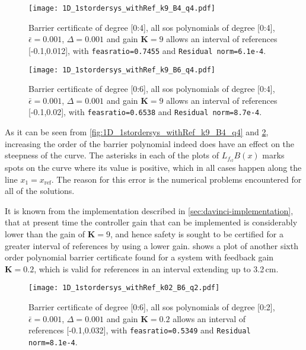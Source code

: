 \begin{figure}[H]
\centering
\texttt{[image: 1D\_1stordersys\_withRef\_k9\_B4\_q4.pdf]}
\caption{Barrier certificate of degree [0:4], all \gls{sos} polynomials of degree [0:4], $\bar{\epsilon}=0.001$, $\Delta=0.001$ and gain $\textbf{K}=9$ allows an interval of references [-0.1,0.012], with \texttt{feasratio=0.7455} and \texttt{Residual norm=6.1e-4}.}
\label{fig:1D_1stordersys_withRef_k9_B4_q4}
\end{figure}
\vspace{2mm}
\begin{figure}[H]
\centering
\texttt{[image: 1D\_1stordersys\_withRef\_k9\_B6\_q4.pdf]}
\caption{Barrier certificate of degree [0:6], all \gls{sos} polynomials of degree [0:4], $\bar{\epsilon}=0.001$, $\Delta=0.001$ and gain $\textbf{K}=9$ allows an interval of references [-0.1,0.02], with \texttt{feasratio=0.6538} and \texttt{Residual norm=8.7e-4}.}
\label{fig:1D_1stordersys_withRef_k9_B6_q4}
\end{figure}

As it can be seen from \autoref{fig:1D_1stordersys_withRef_k9_B4_q4} and \ref{fig:1D_1stordersys_withRef_k9_B6_q4}, increasing the order of the barrier polynomial indeed does have an effect on the steepness of the curve.
The asterisks in each of the plots of $L_{f_{cl}}B(x)$ marks spots on the curve where its value is positive, which in all cases happen along the line $x_1=x_\text{ref}$. The reason for this error is the numerical problems encountered for all of the solutions.

It is known from the implementation described in \autoref{sec:davinci-implementation}, that at present time the controller gain that can be implemented is considerably lower than the gain of $\mathbf{K}=9$, and hence safety is sought to be certified for a greater interval of references by using a lower gain.  shows a plot of another sixth order polynomial barrier certificate found for a system with feedback gain $\mathbf{K}=0.2$, which is valid for references in an interval extending up to 3.2\,cm.

\vspace{5mm}
\begin{figure}[htbp]
\centering
\texttt{[image: 1D\_1stordersys\_withRef\_k02\_B6\_q2.pdf]}
\caption{Barrier certificate of degree [0:6], all \gls{sos} polynomials of degree [0:2], $\bar{\epsilon}=0.001$, $\Delta=0.001$ and gain $\textbf{K}=0.2$ allows an interval of references [-0.1,0.032], with \texttt{feasratio=0.5349} and \texttt{Residual norm=8.1e-4}.}
\label{fig:1D_1stordersys_withRef_k02_B6_q2}
\end{figure}
\vspace{5mm}

